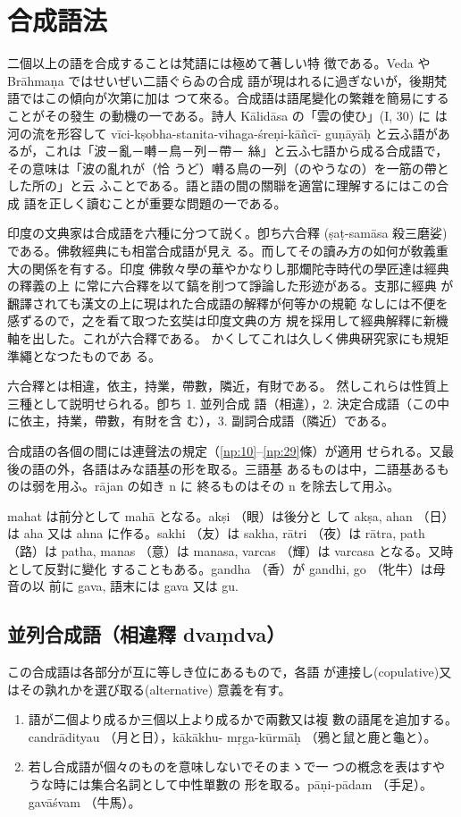 \section{合成語法}
\numberParagraph
二個以上の語を合成することは梵語には極めて著しい特
徴である。Veda や Brāhmaṇa ではせいぜい二語ぐらゐの合成
語が現はれるに過ぎないが，後期梵語ではこの傾向が次第に加は
つて來る。合成語は語尾變化の繁雜を簡易にすることがその發生
の動機の一である。詩人 Kālidāsa の「雲の使ひ」(I, 30) に
は河の流を形容して vīci-kṣobha-stanita-vihaga-śreṇi-kāñcī-
guṇāyāḥ と云ふ語があるが，これは「波－亂－囀－鳥－列－帶－
絲」と云ふ七語から成る合成語で，その意味は「波の亂れが（恰
うど）囀る鳥の一列（のやうなの）を一筋の帶とした所の」と云
ふことである。語と語の間の關聯を適當に理解するにはこの合成
語を正しく讀むことが重要な問題の一である。

\numberParagraph
印度の文典家は合成語を六種に分つて説く。卽ち六合釋
(ṣaṭ-samāsa 殺三磨娑)である。佛敎經典にも相當合成語が見え
る。而してその讀み方の如何が敎義重大の関係を有する。印度
佛敎々學の華やかなりし那爛陀寺時代の學匠達は經典の釋義の上
に常に六合釋を以て鎬を削つて諍論した形迹がある。支那に經典
が飜譯されても漢文の上に現はれた合成語の解釋が何等かの規範
なしには不便を感ずるので，之を看て取つた玄奘は印度文典の方
規を採用して經典解釋に新機軸を出した。これが六合釋である。
かくしてこれは久しく佛典硏究家にも規矩準繩となつたものであ
る。

\numberParagraph
六合釋とは相違，依主，持業，帶數，隣近，有財である。
然しこれらは性質上三種として説明せられる。卽ち 1. 並列合成
語（相違），2. 決定合成語（この中に依主，持業，帶數，有財を含
む），3. 副詞合成語（隣近）である。

\numberParagraph
合成語の各個の間には連聲法の規定（\ref{np:10}--\ref{np:29}條）が適用
せられる。又最後の語の外，各語はみな語基の形を取る。三語基
あるものは中，二語基あるものは弱を用ふ。rājan の如き n に
終るものはその n を除去して用ふ。

\numberParagraph
mahat は前分として mahā となる。akṣi （眼）は後分と
して akṣa, ahan （日）は aha 又は ahna に作る。sakhi （友）は
sakha, rātri （夜）は rātra, path （路）は patha, manas （意）は
manasa, varcas （輝）は varcasa となる。又時として反對に變化
することもある。gandha （香）が gandhi, go （牝牛）は母音の以
前に gava, 語末には gava 又は gu.

\subsection{並列合成語（相違釋 dvaṃdva）}
\numberParagraph
この合成語は各部分が互に等しき位にあるもので，各語
が連接し(copulative)又はその孰れかを選び取る(alternative)
意義を有す。
\begin{enumerate}[label=(\alph*)]
\item 語が二個より成るか三個以上より成るかで兩數又は複
數の語尾を追加する。candrādityau （月と日），kākākhu-%
mṛga-kūrmāḥ （鴉と鼠と鹿と龜と）。
\item 若し合成語が個々のものを意味しないでそのまゝで一
つの槪念を表はすやうな時には集合名詞として中性單數の
形を取る。pāṇi-pādam （手足）。gavāśvam （牛馬）。
\end{enumerate}

